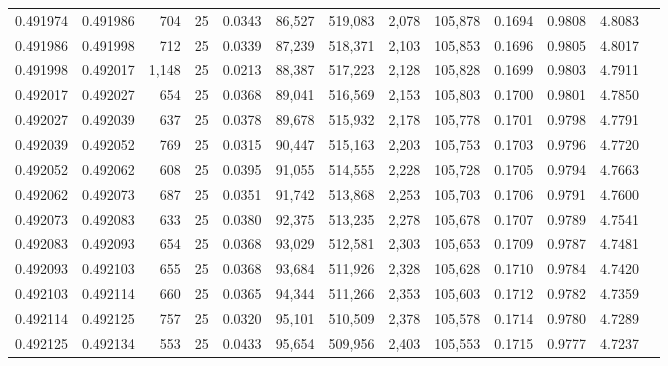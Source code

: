 \begin{tabular}{rrrrrrrrrrrrr}
0.491974 & 0.491986 &   704 &  25 &                                     0.0343 &  86,527 & 519,083 &   2,078 & 105,878 & 0.1694 & 0.9808 & 4.8083 \\
0.491986 & 0.491998 &   712 &  25 &                                     0.0339 &  87,239 & 518,371 &   2,103 & 105,853 & 0.1696 & 0.9805 & 4.8017 \\
0.491998 & 0.492017 & 1,148 &  25 &                                     0.0213 &  88,387 & 517,223 &   2,128 & 105,828 & 0.1699 & 0.9803 & 4.7911 \\
0.492017 & 0.492027 &   654 &  25 &                                     0.0368 &  89,041 & 516,569 &   2,153 & 105,803 & 0.1700 & 0.9801 & 4.7850 \\
0.492027 & 0.492039 &   637 &  25 &                                     0.0378 &  89,678 & 515,932 &   2,178 & 105,778 & 0.1701 & 0.9798 & 4.7791 \\
0.492039 & 0.492052 &   769 &  25 &                                     0.0315 &  90,447 & 515,163 &   2,203 & 105,753 & 0.1703 & 0.9796 & 4.7720 \\
0.492052 & 0.492062 &   608 &  25 &                                     0.0395 &  91,055 & 514,555 &   2,228 & 105,728 & 0.1705 & 0.9794 & 4.7663 \\
0.492062 & 0.492073 &   687 &  25 &                                     0.0351 &  91,742 & 513,868 &   2,253 & 105,703 & 0.1706 & 0.9791 & 4.7600 \\
0.492073 & 0.492083 &   633 &  25 &                                     0.0380 &  92,375 & 513,235 &   2,278 & 105,678 & 0.1707 & 0.9789 & 4.7541 \\
0.492083 & 0.492093 &   654 &  25 &                                     0.0368 &  93,029 & 512,581 &   2,303 & 105,653 & 0.1709 & 0.9787 & 4.7481 \\
0.492093 & 0.492103 &   655 &  25 &                                     0.0368 &  93,684 & 511,926 &   2,328 & 105,628 & 0.1710 & 0.9784 & 4.7420 \\
0.492103 & 0.492114 &   660 &  25 &                                     0.0365 &  94,344 & 511,266 &   2,353 & 105,603 & 0.1712 & 0.9782 & 4.7359 \\
0.492114 & 0.492125 &   757 &  25 &                                     0.0320 &  95,101 & 510,509 &   2,378 & 105,578 & 0.1714 & 0.9780 & 4.7289 \\
0.492125 & 0.492134 &   553 &  25 &                                     0.0433 &  95,654 & 509,956 &   2,403 & 105,553 & 0.1715 & 0.9777 & 4.7237 \\

\end{tabular}
